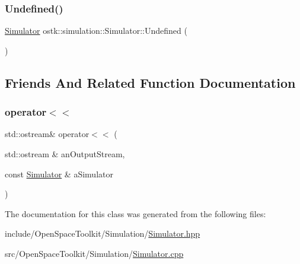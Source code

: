 \subsubsection{\texorpdfstring{Undefined()}{Undefined()}}
{\footnotesize\ttfamily \hyperlink{classostk_1_1simulation_1_1_simulator}{Simulator} ostk\+::simulation\+::\+Simulator\+::\+Undefined (\begin{DoxyParamCaption}{ }\end{DoxyParamCaption})\hspace{0.3cm}{\ttfamily [static]}}



\subsection{Friends And Related Function Documentation}
\mbox{\label{classostk_1_1simulation_1_1_simulator_a69c38d700ebaa96e61bccca4bdbe717d}} 
\subsubsection{\texorpdfstring{operator$<$$<$}{operator<<}}
{\footnotesize\ttfamily std\+::ostream\& operator$<$$<$ (\begin{DoxyParamCaption}\item[{std\+::ostream \&}]{an\+Output\+Stream,  }\item[{const \hyperlink{classostk_1_1simulation_1_1_simulator}{Simulator} \&}]{a\+Simulator }\end{DoxyParamCaption})\hspace{0.3cm}{\ttfamily [friend]}}



The documentation for this class was generated from the following files\+:\begin{DoxyCompactItemize}
\item 
include/\+Open\+Space\+Toolkit/\+Simulation/\hyperlink{_simulator_8hpp}{Simulator.\+hpp}\item 
src/\+Open\+Space\+Toolkit/\+Simulation/\hyperlink{_simulator_8cpp}{Simulator.\+cpp}\end{DoxyCompactItemize}
